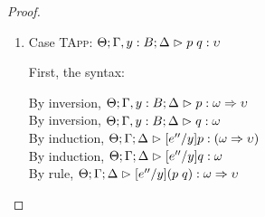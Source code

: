 \begin{proof}
\begin{enumerate}
  First, the syntax:
  \begin{tabbedproof}
    \oo By inversion, $\judgeA[\Theta, \beta:\kappa'; \Gamma, y:B; \Delta]{p}{\upsilon}$ \\
    \oo By weakening, $\judgeE[\Theta, \beta:\kappa']{\Gamma}{e''}{B}$ \\
    \oo By induction, $\judgeA[\Theta, \beta:\kappa'; \Gamma; \Delta]{[e''/y]p}{\upsilon}$ \\
    \oo By rule, $\judgeA{\pfunall{\beta}{\kappa'}{[e''/y]p}}{\forallsort{\beta}{\kappa'}{\upsilon}}$ \\
    \oo By def of subst, $\judgeA{[e''/y](\pfunall{\beta}{\kappa'}{p})}{\forallsort{\beta}{\kappa'}{\upsilon}}$ \\
  \end{tabbedproof}
  For semantics, consider $\interp{\judgeA{[e''/y](\pfun{\beta}{\kappa'}{p})}{\forallsort{\beta}{\kappa'}{\upsilon}}}\;\theta\;\gamma\;\delta$ \\
  \begin{eqnproof}
          {Semantics}
          {Induction}
          {Strengthening}
          {Semantics}
  \end{eqnproof}
  This case relies upon the fact that $\Gamma$ and $\Delta$ do not have $\beta$ free and the 
  equality of sorts under substitution. 



\item Case \textsc{TApp}: $\judgeA[\Theta; \Gamma, y:B; \Delta]{p\;q}{\upsilon}$
  
  First, the syntax:
  \begin{tabbedproof}
    \oo By inversion, $\judgeA[\Theta; \Gamma, y:B; \Delta]{p}{\omega \To \upsilon}$\\
    \oo By inversion, $\judgeA[\Theta; \Gamma, y:B; \Delta]{q}{\omega}$\\
    \oo By induction, $\judgeA[\Theta; \Gamma; \Delta]{[e''/y]p}{(\omega \To \upsilon)}$\\
    \oo By induction, $\judgeA[\Theta; \Gamma; \Delta]{[e''/y]q}{\omega}$\\
    \oo By rule, $\judgeA[\Theta; \Gamma; \Delta]{[e''/y](p\;q)}{\omega \To \upsilon}$\\
  \end{tabbedproof}


\end{enumerate}
\end{proof}
